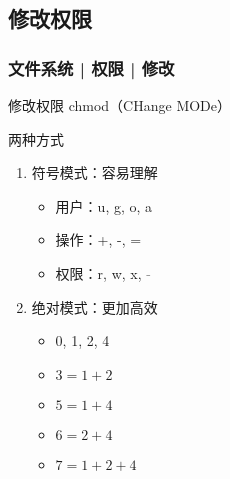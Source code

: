 \subsection{修改权限}
\begin{frame}
  \frametitle{文件系统 | 权限 | \alert{修改}}
  \begin{block}{修改权限}
    chmod（CHange MODe）
  \end{block}
  \pause
  \begin{block}{两种方式}
    \begin{enumerate}
      \item 符号模式：容易理解
        \begin{itemize}
          \item 用户：u, g, o, a
          \item 操作：+, -, =
	  \item 权限：r, w, x, \textcolor{gray}{-}
        \end{itemize}
      \item 绝对模式：更加高效
        \begin{itemize}
          \item 0, 1, 2, 4
          \item $3 = 1 + 2$
          \item $5 = 1 + 4$
          \item $6 = 2 + 4$
          \item $7 = 1 + 2 + 4$
        \end{itemize}
    \end{enumerate}
  \end{block}
\end{frame}

